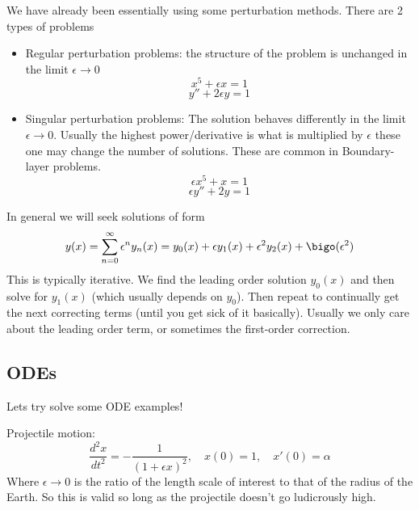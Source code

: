 \documentclass{/home/janmebows/Documents/LatexTemplates/myassignment}
\begin{document}
We have already been essentially using some perturbation methods. There are 2 types of problems
\begin{itemize}
    \item Regular perturbation problems: the structure of the problem is unchanged in the limit $\epsilon\to 0$
    \[x^5 + \epsilon x =1\]
    \[y'' + 2\epsilon y = 1\]
    \item Singular perturbation problems: The solution behaves differently in the limit $\epsilon\to 0$. Usually the highest power/derivative is what is multiplied by $\epsilon$ these one may change the number of solutions. These are common in Boundary-layer problems. 
    \[\epsilon x^5 + x =1\]
    \[\epsilon y'' + 2y =1\]
\end{itemize}

In general we will seek solutions of form
\[y(x) = \sum_{n=0}^\infty \epsilon^n y_n(x) = y_0(x) + \epsilon y_1(x) + \epsilon^2 y_2(x) + \bigo(\epsilon^2)\]
This is typically iterative. We find the leading order solution $y_0(x)$ and then solve for $y_1(x)$ (which usually depends on $y_0$). Then repeat to continually get the next correcting terms (until you get sick of it basically). Usually we only care about the leading order term, or sometimes the first-order correction.


\subsection{ODEs}
Lets try solve some ODE examples!

Projectile motion:
\[\frac{d^2x}{dt^2} = - \frac{1}{(1+\epsilon x)^2}, \quad x(0)=1, \quad x'(0) = \alpha\]
Where $\epsilon\to 0$ is the ratio of the length scale of interest to that of the radius of the Earth. So this is valid so long as the projectile doesn't go ludicrously high.
\end{document}
